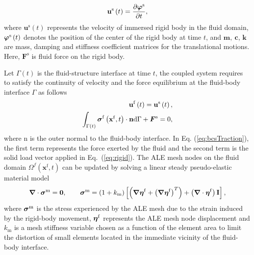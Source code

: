 \documentclass{jfm}
\def\vec#1{\mbox{\boldmath $#1$}}
\newcommand{\bu}{\mathbf{u}}
\def\Ots{\Omega^\mathrm{s}(t)}
\def\Of{\Omega^\mathrm{f}}
\def\Os{\Omega^\mathrm{s}}
\newcommand{\xx}{\mbox{$\mathbf{x}^{\mathrm{f}}$}}
\def\stress{{\vec \sigma}}
\def\div{\vec \nabla}
\def\G{\Gamma}
\begin{document}
\begin{align}
{\bu}^\mathrm{s}\left(t\right) = 
\frac{\partial \vec{\varphi}^\mathrm{s}}{\partial t}, 
\end{align}
where ${\bu}^\mathrm{s}\left(t\right)$ represents the velocity of immersed rigid body in the fluid domain, $\vec{\varphi}^\mathrm{s}\left(t\right)$ denotes
the position of the center 
of the rigid body at time $t$, and
$\mathbf{m},\ \mathbf{c}$, $ \mathbf{k}$ are mass, damping and stiffness coefficient matrices for the translational motions. Here,
 $\mathbf{F}^\mathrm{s}$ is 
 fluid force on the rigid body.  

Let $\G(t)$ is the fluid-structure interface at time $t$,
the coupled system requires to satisfy the continuity of velocity and 
the force equilibrium at the fluid-body interface $\Gamma$ as follows
\begin{align}
{\bu}^\mathrm{f}\left(t\right) = {\bu}^\mathrm{s}\left(t\right) , 
\label{eq:bcsVelocity} \\
\int_{\G(t)} \boldsymbol{\sigma}^\mathrm{f}\left(\xx,t\right)\cdot\boldsymbol{\mathrm{n}} \mathrm{d} \Gamma
+ \vec{F}^\mathrm{s} =0 ,
\label{eq:bcsTraction}
\end{align}
where $\boldsymbol{\mathrm{n}}$  is the outer normal to the fluid-body interface.
In Eq. (\ref{eq:bcsTraction}), the first term represents 
the force exerted by the fluid  
and the second term is the solid load vector applied in Eq.~(\ref{eq:rigid}).
%
The ALE mesh nodes on the fluid domain $\Omega^f(\xx,t)$ can be updated by solving a linear steady pseudo-elastic material model
\begin{align}
\label{MeshEq}
\div \cdot \stress^\mathrm{m} = \vec{0}, \qquad \stress^\mathrm{m} = (1+k_\mathrm{m})\left[\left(\div \vec{\eta}^\mathrm{f}+\left(\div
\vec{\eta}^\mathrm{f}\right)^T\right)+\left(\div \cdot \vec{\eta}^\mathrm{f}\right)\vec{\mathrm{I}} \right], 
\end{align} 
where $\stress^\mathrm{m}$ is the stress experienced by the ALE mesh due 
to the strain induced by the rigid-body movement, 
$\vec{\eta}^\mathrm{f}$ represents the ALE mesh node displacement and 
$k_\mathrm{m}$ is a mesh stiffness variable chosen as a function of the element area to 
limit the distortion of small elements located in the immediate vicinity 
of the fluid-body interface.
\end{document}
